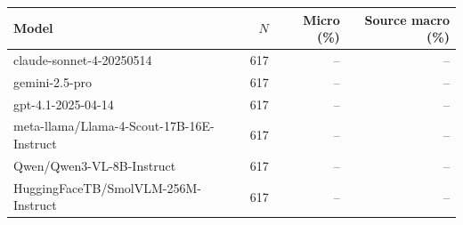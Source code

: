 \begin{tabular}{lrrr}
\toprule
Model & $N$ & Micro (\%) & Source macro (\%) \\
\midrule
claude-sonnet-4-20250514 & 617 & -- & -- \\
gemini-2.5-pro & 617 & -- & -- \\
gpt-4.1-2025-04-14 & 617 & -- & -- \\
meta-llama/Llama-4-Scout-17B-16E-Instruct & 617 & -- & -- \\
Qwen/Qwen3-VL-8B-Instruct & 617 & -- & -- \\
HuggingFaceTB/SmolVLM-256M-Instruct & 617 & -- & -- \\
\bottomrule
\end{tabular}
